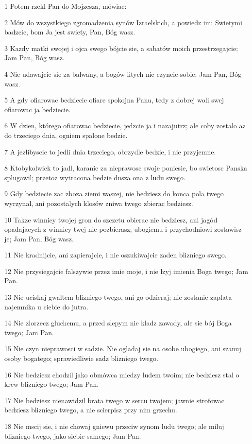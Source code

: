 \par 1 Potem rzekl Pan do Mojzesza, mówiac:
\par 2 Mów do wszystkiego zgromadzenia synów Izraelskich, a powiedz im: Swietymi badzcie, bom Ja jest swiety, Pan, Bóg wasz.
\par 3 Kazdy matki swojej i ojca swego bójcie sie, a sabatów moich przestrzegajcie; Jam Pan, Bóg wasz.
\par 4 Nie udawajcie sie za balwany, a bogów litych nie czyncie sobie; Jam Pan, Bóg wasz.
\par 5 A gdy ofiarowac bedziecie ofiare spokojna Panu, tedy z dobrej woli swej ofiarowac ja bedziecie.
\par 6 W dzien, którego ofiarowac bedziecie, jedzcie ja i nazajutrz; ale coby zostalo az do trzeciego dnia, ogniem spalone bedzie.
\par 7 A jezlibyscie to jedli dnia trzeciego, obrzydle bedzie, i nie przyjemne.
\par 8 Ktobykolwiek to jadl, karanie za nieprawosc swoje poniesie, bo swietosc Panska splugawil; przetoz wytracona bedzie dusza ona z ludu swego.
\par 9 Gdy bedziecie zac zboza ziemi waszej, nie bedziesz do konca pola twego wyrzynal, ani pozostalych klosów zniwa twego zbierac bedziesz.
\par 10 Takze winnicy twojej gron do szczetu obierac nie bedziesz, ani jagód opadajacych z winnicy twej nie pozbierasz; ubogiemu i przychodniowi zostawisz je; Jam Pan, Bóg wasz.
\par 11 Nie kradnijcie, ani zapierajcie, i nie oszukiwajcie zaden blizniego swego.
\par 12 Nie przysiegajcie falszywie przez imie moje, i nie lzyj imienia Boga twego; Jam Pan.
\par 13 Nie uciskaj gwaltem blizniego twego, ani go odzieraj; nie zostanie zaplata najemnika u ciebie do jutra.
\par 14 Nie zlorzecz gluchemu, a przed slepym nie kladz zawady, ale sie bój Boga twego; Jam Pan.
\par 15 Nie czyn nieprawosci w sadzie. Nie ogladaj sie na osobe ubogiego, ani szanuj osoby bogatego; sprawiedliwie sadz blizniego twego.
\par 16 Nie bedziesz chodzil jako obmówca miedzy ludem twoim; nie bedziesz stal o krew blizniego twego; Jam Pan.
\par 17 Nie bedziesz nienawidzil brata twego w sercu twojem; jawnie strofowac bedziesz blizniego twego, a nie scierpisz przy nim grzechu.
\par 18 Nie mscij sie, i nie chowaj gniewu przeciw synom ludu twego; ale miluj blizniego twego, jako siebie samego; Jam Pan.
